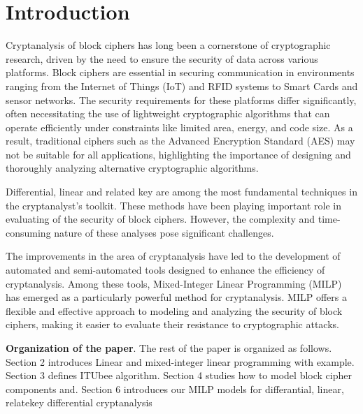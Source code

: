 \section{Introduction}
Cryptanalysis of block ciphers has long been a cornerstone of cryptographic research, driven by the need to ensure the security of data across various platforms. Block ciphers are essential in securing communication in environments ranging from the Internet of Things (IoT) and RFID systems to Smart Cards and sensor networks. The security requirements for these platforms differ significantly, often necessitating the use of lightweight cryptographic algorithms that can operate efficiently under constraints like limited area, energy, and code size. As a result, traditional ciphers such as the Advanced Encryption Standard (AES) may not be suitable for all applications, highlighting the importance of designing and thoroughly analyzing alternative cryptographic algorithms. 

Differential, linear and related key are among the most fundamental techniques in the cryptanalyst's toolkit. These methods have been playing important role in evaluating of the security of block ciphers. However, the complexity and time-consuming nature of these analyses pose significant challenges. 

The improvements in the area of cryptanalysis have led to the development of automated and semi-automated tools designed to enhance the efficiency of cryptanalysis. Among these tools, Mixed-Integer Linear Programming (MILP) has emerged as a particularly powerful method for cryptanalysis. MILP offers a flexible and effective approach to modeling and analyzing the security of block ciphers, making it easier to evaluate their resistance to cryptographic attacks.



\textbf{Organization of the paper}. The rest of the paper is organized as follows. Section 2 introduces Linear and mixed-integer linear programming with example. Section 3 defines ITUbee algorithm. Section 4 studies how to model block cipher components and. Section 6 introduces our MILP models for differantial, linear, relatekey differential cryptanalysis